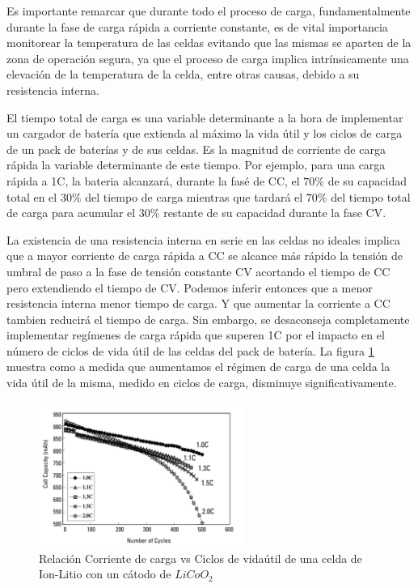 \documentclass[10pt,a4paper]{article}
\begin{document}
Es importante remarcar que durante todo el proceso de carga, 
fundamentalmente durante la fase de carga rápida a corriente constante, es de
vital importancia monitorear la temperatura de las celdas evitando que las
mismas se aparten de la zona de operación segura, ya que el proceso de carga
implica intrínsicamente una elevación de la temperatura de la celda, entre otras
causas, debido a su resistencia interna.

El tiempo total de carga es una variable determinante a la hora de implementar
un cargador de batería que extienda al máximo la vida útil y los ciclos de carga
de un pack de baterías y de sus celdas. Es la magnitud de corriente de carga
rápida la variable determinante de este tiempo. Por ejemplo, para una
carga rápida a 1C, la bateria alcanzará, durante la fasé de \acrshort{CC}, el
$70\%$ de su capacidad total en el $30\%$ del tiempo de carga mientras que
tardará el $70\%$ del tiempo total de carga para acumular el $30\%$ restante de
su capacidad durante la fase \acrshort{CV}. 

La existencia de una resistencia interna en serie en las celdas no ideales
implica que a mayor corriente de carga rápida a CC se alcance más rápido la
tensión de umbral de paso a la fase de tensión constante CV acortando el tiempo
de CC pero extendiendo el tiempo de CV. Podemos inferir entonces que a menor
resistencia interna menor tiempo de carga. Y que aumentar la corriente a CC
tambien reducirá el tiempo de carga.  Sin embargo, se desaconseja completamente
implementar regímenes de carga rápida que superen 1C por el impacto en el número
de ciclos de vida útil de las celdas del pack de batería. La figura
\ref{fig:C_vs_Cycle_I} muestra como a medida que aumentamos el régimen de carga
de una celda la vida \'util de la misma, medido en ciclos de carga, disminuye
significativamente.

\begin{figure}[h!] \centering
    \includegraphics[width=0.6\textwidth]{bat_char/C_vs_Cycle_I.png}
    \caption{Relación Corriente de carga vs Ciclos de vidaútil de una celda de
    Ion-Litio con un cátodo de $LiCoO_2$} \label{fig:C_vs_Cycle_I} 
\end{figure}
\FloatBarrier
\end{document}
